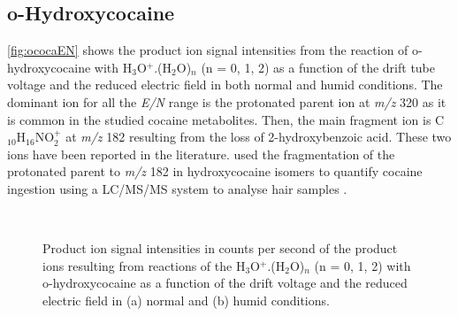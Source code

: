 \subsection{o-Hydroxycocaine}

\autoref{fig:ococaEN} shows the product ion signal intensities from the reaction of o-hydroxycocaine with H$_3$O$^+$.(H$_2$O)$_n$ (n = 0, 1, 2) as a function of the drift tube voltage and the reduced electric field in both normal and humid conditions.
%
The dominant ion for all the \textit{E/N} range is the protonated parent ion at \textit{m/z} 320 as it is common in the studied cocaine metabolites.
%
Then, the main fragment ion is C$_{10}$H$_{16}$NO$_2^+$ at \textit{m/z} 182 resulting from the loss of 2-hydroxybenzoic acid.
%
These two ions have been reported in the literature. 
%
\citeauthor{schaffer2016analysis}  used the fragmentation of the protonated parent to \textit{m/z} 182 in hydroxycocaine isomers to quantify cocaine ingestion using a LC/MS/MS system to analyse hair samples  \cite{schaffer2016analysis}.

\begin{figure}[htbp]
\centering
{}\\
\caption{Product ion signal intensities in counts per second of the product ions resulting from reactions of the H$_3$O$^+$.(H$_2$O)$_n$ (n = 0, 1, 2) with o-hydroxycocaine as a function of the drift voltage and the reduced electric field in (a) normal and (b) humid conditions.} 
\label{fig:ococaEN}
\end{figure}


